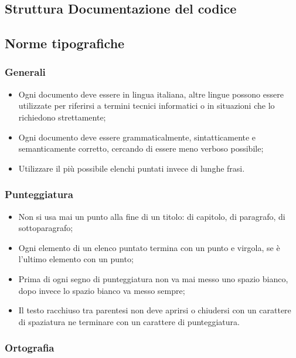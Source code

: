 \subsection{Struttura Documentazione del codice}
\subsection{Norme tipografiche}
\subsubsection{Generali}
\begin{itemize}
\item Ogni documento deve essere in lingua italiana, altre lingue possono essere utilizzate per riferirsi a termini tecnici informatici o in situazioni che lo richiedono strettamente;

\item Ogni documento deve essere grammaticalmente, sintatticamente e semanticamente corretto, cercando di essere meno verboso possibile;

\item Utilizzare il più possibile elenchi puntati invece di lunghe frasi.

\end{itemize}
\subsubsection{Punteggiatura}
\begin{itemize}
\item Non si usa mai un punto alla fine di un titolo: di capitolo, di paragrafo, di sottoparagrafo;

\item Ogni elemento di un elenco puntato termina con un punto e virgola, se è l'ultimo elemento con un punto;

\item Prima di ogni segno di punteggiatura non va mai messo uno spazio bianco, dopo invece lo spazio bianco va messo sempre;

\item Il testo racchiuso tra parentesi non deve aprirsi o chiudersi con un carattere di spaziatura ne terminare con un carattere di punteggiatura.

\end{itemize}
\subsubsection{Ortografia}

